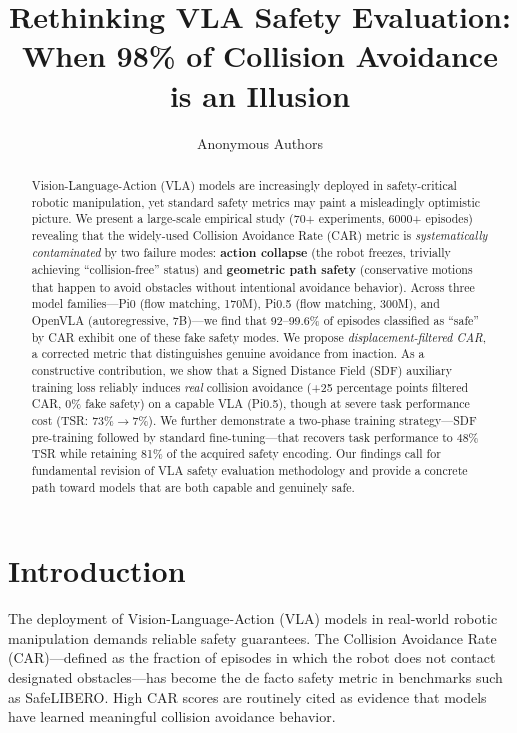 \documentclass[letterpaper]{article}
\title{Rethinking VLA Safety Evaluation: When 98\% of Collision Avoidance is an Illusion}
\author[1]{Anonymous Authors}
\affil[1]{Anonymous Institution}
\date{}
\begin{document}
\maketitle

\begin{abstract}
Vision-Language-Action (VLA) models are increasingly deployed in safety-critical robotic manipulation, yet standard safety metrics may paint a misleadingly optimistic picture.
We present a large-scale empirical study (70+ experiments, 6000+ episodes) revealing that the widely-used Collision Avoidance Rate (CAR) metric is \emph{systematically contaminated} by two failure modes: \textbf{action collapse} (the robot freezes, trivially achieving ``collision-free'' status) and \textbf{geometric path safety} (conservative motions that happen to avoid obstacles without intentional avoidance behavior).
Across three model families---Pi0 (flow matching, 170M), Pi0.5 (flow matching, 300M), and OpenVLA (autoregressive, 7B)---we find that 92--99.6\% of episodes classified as ``safe'' by CAR exhibit one of these fake safety modes.
We propose \emph{displacement-filtered CAR}, a corrected metric that distinguishes genuine avoidance from inaction.
As a constructive contribution, we show that a Signed Distance Field (SDF) auxiliary training loss reliably induces \emph{real} collision avoidance (+25 percentage points filtered CAR, 0\% fake safety) on a capable VLA (Pi0.5), though at severe task performance cost (TSR: 73\%$\to$7\%).
We further demonstrate a two-phase training strategy---SDF pre-training followed by standard fine-tuning---that recovers task performance to 48\% TSR while retaining 81\% of the acquired safety encoding.
Our findings call for fundamental revision of VLA safety evaluation methodology and provide a concrete path toward models that are both capable and genuinely safe.
\end{abstract}

\section{Introduction}
\label{sec:intro}

The deployment of Vision-Language-Action (VLA) models in real-world robotic manipulation demands reliable safety guarantees. The Collision Avoidance Rate (CAR)---defined as the fraction of episodes in which the robot does not contact designated obstacles---has become the de facto safety metric in benchmarks such as SafeLIBERO. High CAR scores are routinely cited as evidence that models have learned meaningful collision avoidance behavior.
\end{document}
